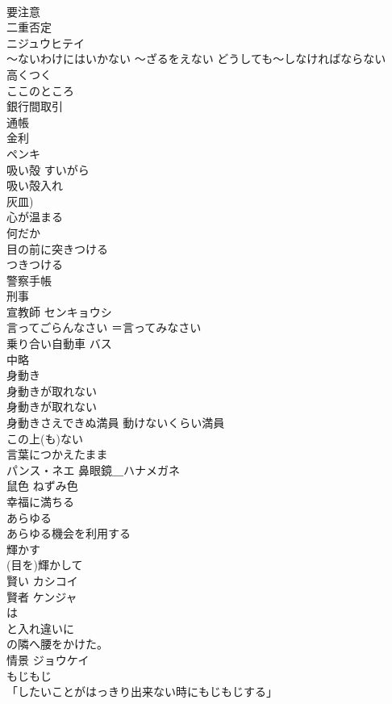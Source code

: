\documentclass[8pt]{extreport}
\begin{document}
\begin{CJK}{UTF8}{min}
\\	要注意	
\\	二重否定	
\\	ニジュウヒテイ
\\	〜ないわけにはいかない 〜ざるをえない	どうしても〜しなければならない
\\	高くつく	
\\	ここのところ	
\\	銀行間取引	
\\	通帳	
\\	金利	
\\	ペンキ	
\\	吸い殻	すいがら 
\\	吸い殻入れ
\\	灰皿)
\\	心が温まる	
\\	何だか	
\\	目の前に突きつける	
\\	つきつける
\\	警察手帳	
\\	刑事	
\\	宣教師	センキョウシ 
\\	言ってごらんなさい	＝言ってみなさい
\\	乗り合い自動車	バス
\\	中略	
\\	身動き	
\\	身動きが取れない
\\	身動きが取れない
\\	身動きさえできぬ満員	動けないくらい満員
\\	この上(も)ない	
\\	言葉につかえたまま	
\\	パンス・ネエ	鼻眼鏡＿ハナメガネ 
\\	鼠色	ねずみ色 
\\	幸福に満ちる	
\\	あらゆる	
\\	あらゆる機会を利用する 
\\	輝かす 
\\	(目を)輝かして	
\\	賢い	カシコイ
\\	賢者	ケンジャ 
\\	は
\\	と入れ違いに
\\	の隣へ腰をかけた。	
\\	情景	ジョウケイ 
\\	もじもじ	
\\	「したいことがはっきり出来ない時にもじもじする」

\end{CJK}
\end{document}
